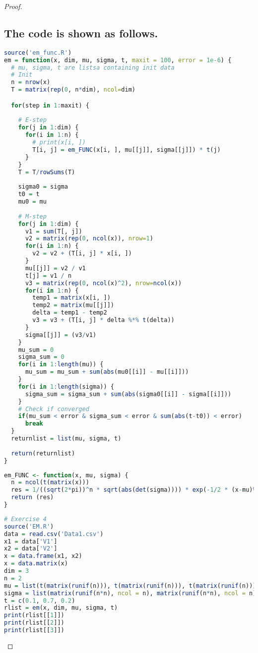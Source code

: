 \documentclass{article}
\begin{document}
\begin{proof}
\subsection{The code is shown as follows.}
\begin{lstlisting}[language = {R}]
source('em_func.R')
em = function(x, dim, mu, sigma, t, maxit = 100, error = 1e-6) {
  # mu, sigma, t are listsa containing init data
  # Init
  n = nrow(x)
  T = matrix(rep(0, n*dim), ncol=dim)

  for(step in 1:maxit) {
    
    # E-step
    for(j in 1:dim) {
      for(i in 1:n) {
        # print(x[i, ])
        T[i, j] = em_FUNC(x[i, ], mu[[j]], sigma[[j]]) * t(j)
      }
    }
    T = T/rowSums(T)
    
    sigma0 = sigma
    t0 = t
    mu0 = mu
    
    # M-step
    for(j in 1:dim) {
      v1 = sum(T[, j])
      v2 = matrix(rep(0, ncol(x)), nrow=1)
      for(i in 1:n) {
        v2 = v2 + (T[i, j] * x[i, ])
      }
      mu[[j]] = v2 / v1
      t[j] = v1 / n
      v3 = matrix(rep(0, ncol(x)^2), nrow=ncol(x))
      for(i in 1:n) {
        temp1 = matrix(x[i, ])
        temp2 = matrix(mu[[j]])
        delta = temp1 - temp2
        v3 = v3 + (T[i, j] * delta %*% t(delta))
      }
      sigma[[j]] = (v3/v1)
    }
    mu_sum = 0
    sigma_sum = 0
    for(i in 1:length(mu)) {
      mu_sum = mu_sum + sum(abs(mu0[[i]] - mu[[i]]))
    }
    for(i in 1:length(sigma)) {
      sigma_sum = sigma_sum + sum(abs(sigma0[[i]] - sigma[[i]]))
    }
    # Check if converged
    if(mu_sum < error & sigma_sum < error & sum(abs(t-t0)) < error)
      break
  }
  returnlist = list(mu, sigma, t)
  
  return(returnlist)
}
\end{lstlisting}
\begin{lstlisting}[language={R}]
em_FUNC <- function(x, mu, sigma) {
  n = ncol(t(matrix(x)))
  res = 1/((sqrt(2*pi))^n * sqrt(abs(det(sigma)))) * exp(-1/2 * (x-mu)%*%solve(sigma)%*%t(x-mu))
  return (res)
}
\end{lstlisting}
\begin{lstlisting}[language={R}]
# Exercise 4
source('EM.R')
data = read.csv('Data1.csv')
x1 = data['V1']
x2 = data['V2']
x = data.frame(x1, x2)
x = data.matrix(x)
dim = 3
n = 2
mu = list(t(matrix(runif(n))), t(matrix(runif(n))), t(matrix(runif(n))))
sigma = list(matrix(runif(n*n), ncol = n), matrix(runif(n*n), ncol = n), matrix(runif(n*n), ncol = n))
t = c(0.1, 0.7, 0.2)
rlist = em(x, dim, mu, sigma, t)
print(rlist[[1]])
print(rlist[[2]])
print(rlist[[3]])
\end{lstlisting}

\end{proof}
\end{document}
